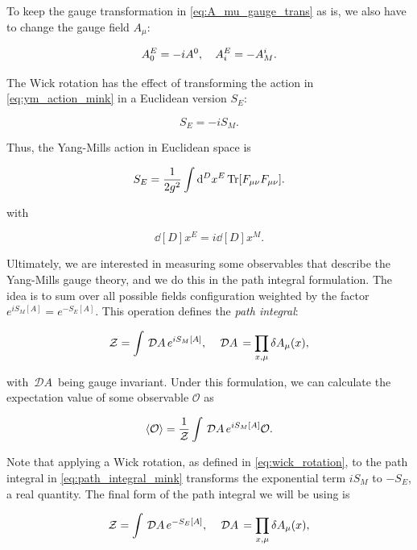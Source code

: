 \documentclass[reqno,12pt]{article}
\numberwithin{equation}{section}
\newcommand{\D}[1]{\,\mathcal{D}#1\,}
\newcommand{\Z}{\mathcal{Z}}
\begin{document}
To keep the gauge transformation in \eqref{eq:A_mu_gauge_trans} as is, we also have to change the gauge field $A_\mu$:

\begin{equation}
	A_0^E = -i A^0 \qc A_i^E = -A^i_M.
\end{equation}

The Wick rotation has the effect of transforming the action in \eqref{eq:ym_action_mink} in a Euclidean version $S_E$:

\begin{equation}
	S_E = -i S_M.
\end{equation}

Thus, the Yang-Mills action in Euclidean space is

\begin{equation} \label{eq:ym_action}
	S_E = \frac{1}{2g^2} \int \dd[D]{x^E} \Tr[F_{\mu\nu}F_{\mu\nu}].
\end{equation}

with 

\begin{equation}
	\dd[D]{x^E} = i \dd[D]{x^M}.
\end{equation}

Ultimately, we are interested in measuring some observables that describe the Yang-Mills gauge theory, and we
do this in the path integral formulation. The idea is to
sum over all possible fields configuration weighted by the factor $e^{iS_M[A]} = e^{-S_E[A]}$.
This operation defines the \textit{path integral}:

\begin{equation} \label{eq:path_integral_mink}
	\Z = \int \D{A} e^{iS_M[A]} \qc \D{A} = \prod_{x, \mu} \delta A_\mu(x),
\end{equation}

with $\D{A}$ being gauge invariant. 
Under this formulation, we can calculate the expectation value of
some observable $\mathcal{O}$ as 

\begin{equation}
	\expval{\mathcal{O}} = \frac{1}{\Z} \int \D{A} e^{iS_M[A]} \mathcal{O}.
\end{equation}

Note that applying a Wick rotation, as defined in \eqref{eq:wick_rotation}, to
the path integral in \eqref{eq:path_integral_mink} transforms the exponential term $iS_M$ to $-S_E$,
a real quantity. The final form of the path integral we will be using is 

\begin{equation} \label{eq:path_integral}
	\Z = \int \D{A} e^{-S_E[A]} \qc \D{A} = \prod_{x, \mu} \delta A_\mu(x),
\end{equation}
\end{document}
